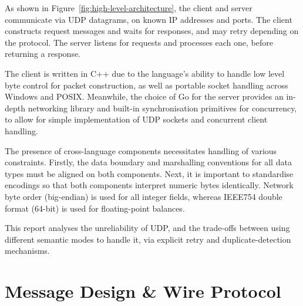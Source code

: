 \documentclass[9pt,a4paper]{article}
\begin{document}
As shown in Figure~\ref{fig:high-level-architecture}, the client and server communicate via UDP datagrams, on known IP addresses and ports. The client constructs request messages and waits for responses, and may retry depending on the protocol. The server listens for requests and processes each one, before returning a response.

The client is written in C++ due to the language's ability to handle low level byte control for packet construction, as well as portable socket handling across Windows and POSIX. Meanwhile, the choice of Go for the server provides an in-depth networking library and built-in synchronisation primitives for concurrency, to allow for simple implementation of UDP sockets and concurrent client handling.

The presence of cross-language components necessitates handling of various constraints. Firstly, the data boundary and marshalling conventions for all data types must be aligned on both components. Next, it is important to standardise encodings so that both components interpret numeric bytes identically. Network byte order (big-endian) is used for all integer fields, whereas IEEE754 double format (64-bit) is used for floating-point balances.

This report analyses the unreliability of UDP, and the trade-offs between using different semantic modes to handle it, via explicit retry and duplicate-detection mechanisms.

\section{Message Design \& Wire Protocol}
\end{document}
